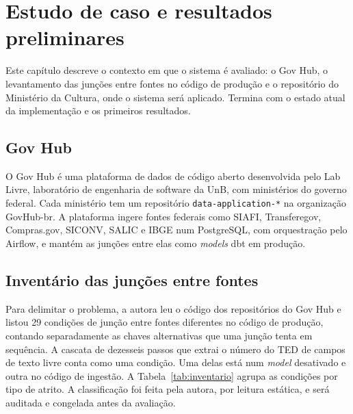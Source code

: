 \chapter{Estudo de caso e resultados preliminares}
\label{chap:estudodecaso}

Este capítulo descreve o contexto em que o sistema é avaliado: o Gov Hub, o
levantamento das junções entre fontes no código de produção e o repositório
do Ministério da Cultura, onde o sistema será aplicado. Termina com o estado
atual da implementação e os primeiros resultados.

\section{Gov Hub}
\label{sec:estudodecaso-govhub}

O Gov Hub é uma plataforma de dados de código aberto desenvolvida pelo Lab
Livre, laboratório de engenharia de software da UnB, com ministérios do
governo federal. Cada ministério tem um repositório
\texttt{data-application-*} na organização GovHub-br. A plataforma ingere
fontes federais como SIAFI, Transferegov, Compras.gov, SICONV, SALIC e IBGE
num PostgreSQL, com orquestração pelo Airflow, e mantém as junções entre elas
como \emph{models} dbt em produção.

\section{Inventário das junções entre fontes}
\label{sec:estudodecaso-inventario}

Para delimitar o problema, a autora leu o código dos repositórios do Gov Hub e
listou 29 condições de junção entre fontes diferentes no código de produção,
contando separadamente as chaves alternativas que uma junção tenta em
sequência. A cascata de dezesseis passos que extrai o número do TED de campos
de texto livre conta como uma condição. Uma delas está num \emph{model}
desativado e outra no código de ingestão. A Tabela~\ref{tab:inventario}
agrupa as condições por tipo de atrito. A classificação foi feita pela
autora, por leitura estática, e será auditada e congelada antes da avaliação.

